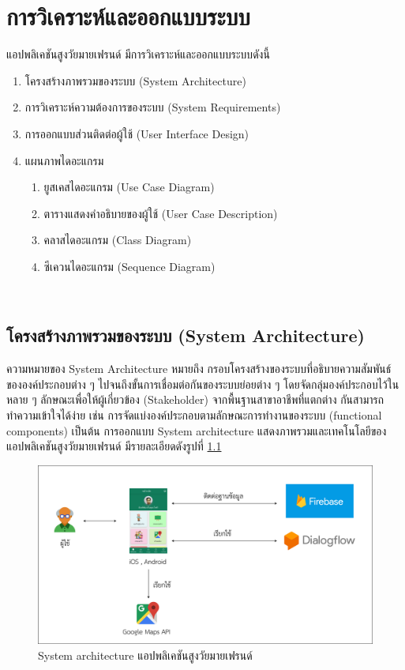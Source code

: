 \chapter{การวิเคราะห์และออกแบบระบบ}

แอปพลิเคชันสูงวัยมายเฟรนด์ มีการวิเคราะห์และออกแบบระบบดังนี้

\begin{enumerate}[label=3.\arabic*]
	\item โครงสร้างภาพรวมของระบบ (System Architecture)
	\item การวิเคราะห์ความต้องการของระบบ (System Requirements)
	\item การออกแบบส่วนติดต่อผู้ใช้ (User Interface Design)
	\item แผนภาพไดอะแกรม
	\begin{enumerate}[label=3.4.\arabic*]
		\item ยูสเคสไดอะแกรม (Use Case Diagram)
		\item ตารางแสดงคำอธิบายของผู้ใช้ (User Case Description)
		\item คลาสไดอะแกรม (Class Diagram)
		\item ซีเควนไดอะแกรม (Sequence Diagram)
	\end{enumerate}	
\end{enumerate}	\\


\section{โครงสร้างภาพรวมของระบบ (System Architecture)}
ความหมายของ System Architecture \cite{architecture} หมายถึง กรอบโครงสร้างของระบบที่อธิบายความสัมพันธ์ขององค์ประกอบต่าง ๆ ไปจนถึงขั้นการเชื่อมต่อกันของระบบย่อยต่าง ๆ โดยจัดกลุ่มองค์ประกอบไว้ในหลาย ๆ ลักษณะเพื่อให้ผู้เกี่ยวข้อง (Stakeholder) จากพื้นฐานสาขาอาชีพที่แตกต่าง กันสามารถทำความเข้าใจได้ง่าย เช่น การจัดแบ่งองค์ประกอบตามลักษณะการทำงานของระบบ (functional components) เป็นต้น
การออกแบบ System architecture แสดงภาพรวมและเทคโนโลยีของแอปพลิเคชันสูงวัยมายเฟรนด์ มีรายละเอียดดังรูปที่ \ref{Fig:structure_app}
\begin{figure}[H]
	\centering
	\includegraphics[width=\textwidth]{Figures/3/architecture/structure_app}
	\caption{System architecture แอปพลิเคชันสูงวัยมายเฟรนด์}
	\label{Fig:structure_app}
\end{figure}

